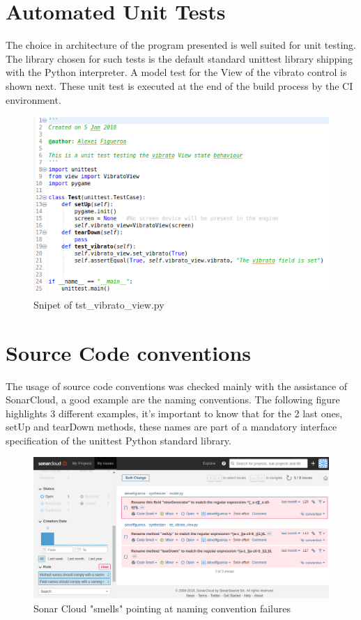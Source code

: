 \documentclass[margin,line,a4paper,authoryear,12pt]{report}
\begin{document}
\section{Automated Unit Tests}
The choice in architecture of the program presented is well suited for unit testing. The library chosen for such tests is the default
standard unittest library shipping with the Python interpreter. A model test for the View of the vibrato control is shown next. These unit test
is executed at the end of the build process by the CI environment.
\begin{figure}[h!]
    \centering
    \includegraphics[width=0.8\linewidth]{vibrato_test.png}
    \caption{Snipet of tst\_vibrato\_view.py}
    \label{fig:gitk}
\end{figure}
\section{Source Code conventions}
The usage of source code conventions was checked mainly with the assistance of SonarCloud, a good example are the naming conventions.
The following figure highlights 3 different examples, it's important to know that for the 2 last ones, setUp and tearDown methods, these names
are part of a mandatory interface specification of the unittest Python standard library.
\begin{figure}[h!]
    \centering
    \includegraphics[width=\linewidth]{naming_convention.png}
    \caption{Sonar Cloud "smells" pointing at naming convention failures}
    \label{fig:smells}
\end{figure}
\end{document}
